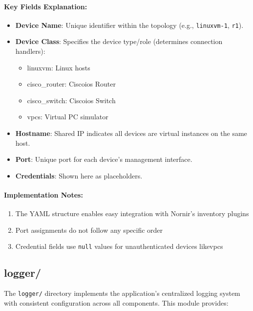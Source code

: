         \paragraph{Key Fields Explanation:}
        \begin{itemize}
            \item \textbf{Device Name}: Unique identifier within the topology (e.g., \texttt{linuxvm-1}, \texttt{r1}).
            \item \textbf{Device Class}: Specifies the device type/role (determines connection handlers):
            \begin{itemize}
                \item linuxvm: Linux hosts
                \item cisco\_router: Cisco\ac{ios} Router
                \item cisco\_switch: Cisco\ac{ios} Switch
                \item vpcs: Virtual PC simulator
            \end{itemize}
            \item \textbf{Hostname}: Shared IP indicates all devices are virtual instances on the same host.
            \item \textbf{Port}: Unique port for each device's management interface.
            \item \textbf{Credentials}: Shown here as placeholders.
        \end{itemize}

        \paragraph{Implementation Notes:}
        \begin{enumerate}
            \item The YAML structure enables easy integration with Nornir's inventory plugins
            \item Port assignments do not follow any specific order
            \item Credential fields use \texttt{null} values for unauthenticated devices like\ac{vpcs}
        \end{enumerate}



    \subsection{logger/}
        The \texttt{logger/} directory implements the application's centralized logging system with consistent 
        configuration across all components. This module provides:

